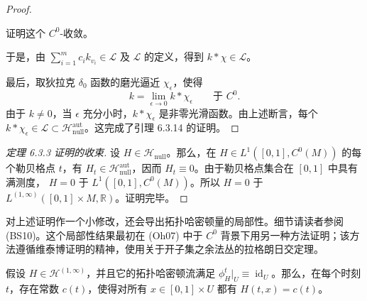 \begin{proof}
\begin{exercise}\label{ex:convolution-c0-convergence}
证明这个 $C^0$-收敛。
\end{exercise}

于是，由 $\sum_{i=1}^m c_i k_{v_i}\in\mathcal L$ 及
$\mathcal L$ 的定义，得到 $k*\chi\in\mathcal L$。

最后，取狄拉克 $\delta_0$ 函数的磨光逼近 $\chi_\epsilon$，使得
\[
 k=\lim_{\epsilon\to0}k*\chi_\epsilon
 \qquad\text{于 }C^0.
\]
由于 $k\ne0$，当 $\epsilon$ 充分小时，$k*\chi_\epsilon$ 是非零光滑函数。由上述断言，每个
$k*\chi_\epsilon\in\mathcal L\subset
\mathcal H_{\mathrm{null}}^{\mathrm{aut}}$。这完成了引理
6.3.14 的证明。
\end{proof}

\begin{proof}[定理 6.3.3 证明的收束]
设 $H\in\mathcal H_{\mathrm{null}}$。那么，在
$H\in L^1([0,1],C^0(M))$ 的每个勒贝格点 $t$，有
$H_t\in\mathcal H_{\mathrm{null}}^{\mathrm{aut}}$，因而
$H_t\equiv0$。由于勒贝格点集合在 $[0,1]$ 中具有满测度，
$H=0$ 于 $L^1([0,1],C^0(M))$。所以
$H=0$ 于 $L^{(1,\infty)}([0,1]\times M,\mathbb R)$。证明完毕。
\end{proof}

对上述证明作一个小修改，还会导出拓扑哈密顿量的局部性。细节请读者参阅 (BS10)。这个局部性结果最初在 (Oh07) 中于
$C^0$ 背景下用另一种方法证明；该方法遵循维泰博证明的精神，使用关于开子集之余法丛的拉格朗日交定理。

\begin{theorem}
\label{thm:locality-topological-hamiltonian}
假设 $H\in\mathcal H^{(1,\infty)}$，并且它的拓扑哈密顿流满足
$\phi_H^t|_U\equiv\operatorname{id}_U$。那么，在每个时刻 $t$，存在常数
$c(t)$，使得对所有 $x\in[0,1]\times U$ 都有
$H(t,x)=c(t)$。
\end{theorem}
